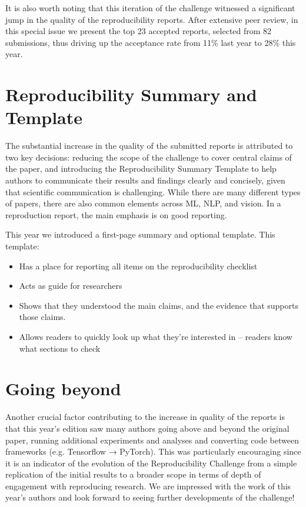 It is also worth noting that this iteration of the challenge witnessed a significant jump in the quality of the reproducibility reports. After extensive peer review, in this special issue we present the top 23 accepted reports, selected from 82 submissions, thus driving up the acceptance rate from 11\% last year to 28\% this year.


\section{Reproducibility Summary and Template}

The substantial increase in the quality of the submitted reports is attributed to two key decisions: reducing the scope of the challenge to cover central claims of the paper, and introducing the Reproducibility Summary Template to help authors to communicate their results and findings clearly and concisely, given that scientific communication is challenging. While there are many different types of papers, there are also common elements across ML, NLP, and vision. In a reproduction report, the main emphasis is on good reporting.

This year we introduced a first-page summary and optional template. This template:
\begin{itemize}
  \item Has a place for reporting all items on the reproducibility checklist
  \item Acts as guide for researchers
  \item Shows that they understood the main claims, and the evidence that supports those claims.
  \item Allows readers to quickly look up what they're interested in -- readers know what sections to check
\end{itemize}

\section{Going beyond}

Another crucial factor contributing to the increase in quality of the reports is that this year’s edition saw many authors going above and beyond the original paper, running additional experiments and analyses and converting code between frameworks (e.g. Tensorflow → PyTorch). This was particularly encouraging since it is an indicator of the evolution of the Reproducibility Challenge from a simple replication of the initial results to a broader scope in terms of depth of engagement with reproducing research. We are impressed with the work of this year’s authors and look forward to seeing further developments of the challenge!


